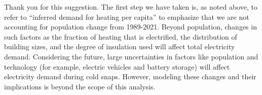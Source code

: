 \documentclass{ar2rc}
\begin{document}
\AR Thank you for this suggestion. The first step we have taken is, as noted above, to refer to ``inferred demand for heating per capita'' to emphasize that we are not accounting for population change from 1989-2021. Beyond population, changes in such factors as the fraction of heating that is electrified, the distribution of building sizes, and the degree of insulation used will affect total electricity demand. Considering the future, large uncertainties in factors like population and technology (for example, electric vehicles and battery storage) will affect electricity demand during cold snaps. However, modeling these changes and their implications is beyond the scope of this analysis.



\end{document}
